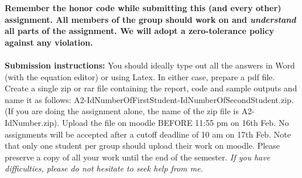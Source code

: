 \documentclass[11pt]{article}
\begin{document}
\maketitle

\textbf{Remember the honor code while submitting this (and every other) assignment. All members of the group should work on and \emph{understand} all parts of the assignment. We will adopt a \textbf{zero-tolerance policy} against any violation.}
\\
\\
\textbf{Submission instructions:} You should ideally type out all the answers in Word (with the equation editor) or using Latex. In either case, prepare a pdf file. Create a single zip or rar file containing the report, code and sample outputs and name it as follows: A2-IdNumberOfFirstStudent-IdNumberOfSecondStudent.zip. (If you are doing the assignment alone, the name of the zip file is A2-IdNumber.zip). Upload the file on moodle BEFORE 11:55 pm on 16th Feb. No assignments will be accepted after a cutoff deadline of 10 am on 17th Feb. Note that only one student per group should upload their work on moodle. Please preserve a copy of all your work until the end of the semester. \emph{If you have difficulties, please do not hesitate to seek help from me.} 
\end{document}
